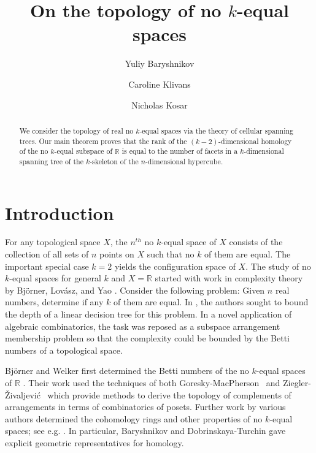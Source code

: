 \documentclass{amsart}
\newcommand{\R}{{\mathbb R}}
\begin{document}
\title[Cubes, Trees, and No $k$-equals]{On the topology of no $k$-equal spaces}
\author{Yuliy Baryshnikov}
\address[Yuliy Baryshnikov]{University of Illinois at Urbana-Champaign}
\author{Caroline Klivans}
\address[Caroline Klivans]{Brown University}
\author{Nicholas Kosar}
\address[Nicholas Kosar]{University of Illinois at Urbana-Champaign}



\begin{abstract}
  We consider the topology of real no $k$-equal spaces via the theory of cellular spanning trees.   Our main theorem proves that
the rank of the $(k-2)$-dimensional homology of the no $k$-equal subspace of $\R$ is equal to
  the number of facets in a $k$-dimensional spanning tree of the $k$-skeleton of the $n$-dimensional hypercube.
\end{abstract}



\maketitle


\section{Introduction}




For any topological space $X$, the $n^{th}$ no $k$-equal space of $X$
consists of the collection of all sets of $n$ points on $X$ such that
no $k$ of them are equal. The important special case $k=2$ yields the
configuration space of $X$. The study of no $k$-equal spaces for
general $k$ and $X = \R$ started with work in complexity theory by
Bj\"{o}rner, Lov\'{a}sz, and Yao \cite{BLY}.  Consider the following
problem: Given $n$ real numbers, determine if any $k$ of them are
equal.
 In \cite{BLY}, the authors sought to bound the depth of a linear
 decision tree for this problem.  In a novel application of algebraic
 combinatorics, the task was reposed as a subspace arrangement
 membership problem so that the complexity could be bounded by the
 Betti numbers of a topological space.


Bj\"{o}rner and Welker first determined the Betti numbers of the no
$k$-equal spaces of $\R$ \cite{BW}.  Their work used the techniques of
both Goresky-MacPherson~\cite{GM} and Ziegler-\v{Z}ivaljevi\'c~\cite{ZZ}
which provide methods to derive the topology of complements of
arrangements in terms of combinatorics of posets.  Further work by
various authors determined the cohomology rings and other properties
of no $k$-equal spaces; see e.g. \cite{Yuz, YB2, DT}.  In particular,
Baryshnikov and Dobrinskaya-Turchin gave explicit geometric
representatives for homology.
\end{document}
